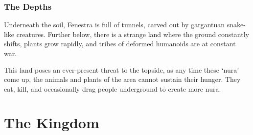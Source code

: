 \begin{multicols}{2}
\subsubsection{The Depths}

Underneath the soil, Fenestra is full of tunnels, carved out by gargantuan snake-like creatures.
Further below, there is a strange land where the ground constantly shifts, plants grow rapidly, and tribes of deformed humanoids are at constant war.

This land poses an ever-present threat to the topside, as any time these `nura' come up, the animals and plants of the area cannot sustain their hunger.
They eat, kill, and occasionally drag people underground to create more nura.

\end{multicols}

\section{The Kingdom}


